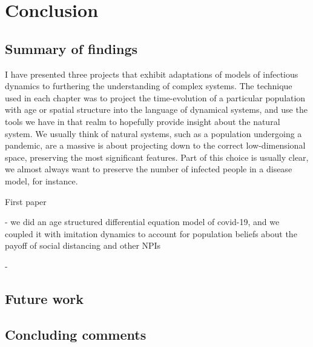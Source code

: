 \chapter{Conclusion}

\section{Summary of findings}

I have presented three projects that exhibit adaptations of models of infectious dynamics to furthering the understanding of complex systems. The technique used in each chapter was to project the time-evolution of a particular population with age or spatial structure into the language of dynamical systems, and use the tools we have in that realm to hopefully provide insight about the natural system. We usually think of natural systems, such as a population undergoing a pandemic, are a massive  is about projecting down to the correct low-dimensional space, preserving the most significant features. Part of this choice is usually clear, we almost always want to preserve the number of infected people in a disease model, for instance. 


First paper

- we did an age structured differential equation model of covid-19, and we coupled it with imitation dynamics to account for population beliefs about the payoff of social distancing and other NPIs

- 



\section{Future work}



\section{Concluding comments}